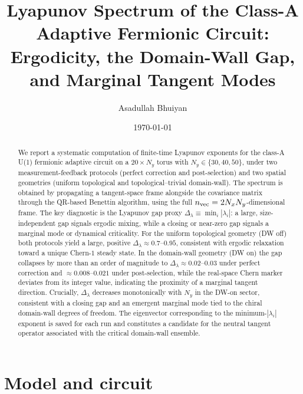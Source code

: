 \documentclass[aps,twocolumn,floatfix,superscriptaddress,nofootinbib]{revtex4-2}
\newcommand{\lam}{\lambda}
\newcommand{\Dlam}{{\Delta_{\lambda}}}
\begin{document}
\title{Lyapunov Spectrum of the Class-A Adaptive Fermionic Circuit: \\
Ergodicity, the Domain-Wall Gap, and Marginal Tangent Modes}

\author{Asadullah Bhuiyan}

\date{\today}

\begin{abstract}
We report a systematic computation of finite-time Lyapunov exponents for the
class-A U(1) fermionic adaptive circuit on a $20\times N_y$ torus with
$N_y\in\{30,40,50\}$, under two measurement-feedback protocols (perfect
correction and post-selection) and two spatial geometries (uniform topological
and topological--trivial domain-wall).  The spectrum is obtained by propagating
a tangent-space frame alongside the covariance matrix through the QR-based
Benettin algorithm, using the full $n_{\rm vec}=2N_xN_y$-dimensional frame.
The key diagnostic is the Lyapunov gap proxy $\Dlam\equiv\min_i|\lam_i|$:
a large, size-independent gap signals ergodic mixing, while a closing or
near-zero gap signals a marginal mode or dynamical criticality.
For the uniform topological geometry (DW off) both protocols yield a large,
positive $\Dlam\approx 0.7$--$0.95$, consistent with ergodic relaxation toward
a unique Chern-$1$ steady state.  In the domain-wall geometry (DW on) the gap
collapses by more than an order of magnitude to $\Dlam\approx 0.02$--$0.03$
under perfect correction and $\approx 0.008$--$0.021$ under post-selection,
while the real-space Chern marker deviates from its integer value, indicating
the proximity of a marginal tangent direction.  Crucially, $\Dlam$ decreases
monotonically with $N_y$ in the DW-on sector, consistent with a closing gap
and an emergent marginal mode tied to the chiral domain-wall degrees of freedom.
The eigenvector corresponding to the minimum-$|\lam_i|$ exponent is saved for
each run and constitutes a candidate for the neutral tangent operator
associated with the critical domain-wall ensemble.
\end{abstract}

\maketitle

\section{Model and circuit}
\label{sec:model}
\end{document}
